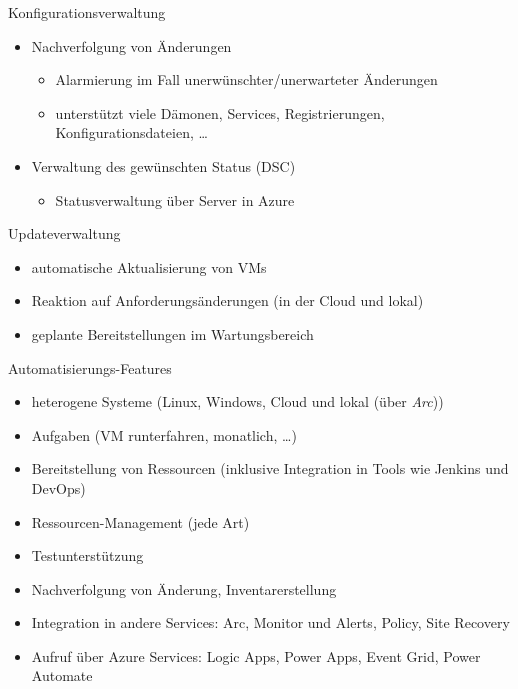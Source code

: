 \begin{flashcard}[]{Konfigurationsverwaltung}
  \begin{itemize}
    \item Nachverfolgung von Änderungen
      \begin{itemize}
        \item Alarmierung im Fall unerwünschter/unerwarteter Änderungen
        \item unterstützt viele Dämonen, Services, Registrierungen, Konfigurationsdateien, \ldots
      \end{itemize}
    \item Verwaltung des gewünschten Status (DSC)
      \begin{itemize}
        \item Statusverwaltung über Server in Azure
      \end{itemize}
  \end{itemize}
\end{flashcard}

\begin{flashcard}[]{Updateverwaltung}
  \begin{itemize}
    \item automatische Aktualisierung von VMs
    \item Reaktion auf Anforderungsänderungen (in der Cloud und lokal)
    \item geplante Bereitstellungen im Wartungsbereich
  \end{itemize}
\end{flashcard}

\begin{flashcard}[]{Automatisierungs-Features}
  \begin{itemize}
    \item heterogene Systeme (Linux, Windows, Cloud und lokal (über \emph{Arc}))
    \item Aufgaben (VM runterfahren, monatlich, \ldots)
    \item Bereitstellung von Ressourcen (inklusive Integration in Tools wie Jenkins und DevOps)
    \item Ressourcen-Management (jede Art)
    \item Testunterstützung
    \item Nachverfolgung von Änderung, Inventarerstellung
    \item Integration in andere Services:\newline
      Arc, Monitor und Alerts, Policy, Site Recovery
    \item Aufruf über Azure Services:\newline
      Logic Apps, Power Apps, Event Grid, Power Automate
  \end{itemize}
\end{flashcard}

